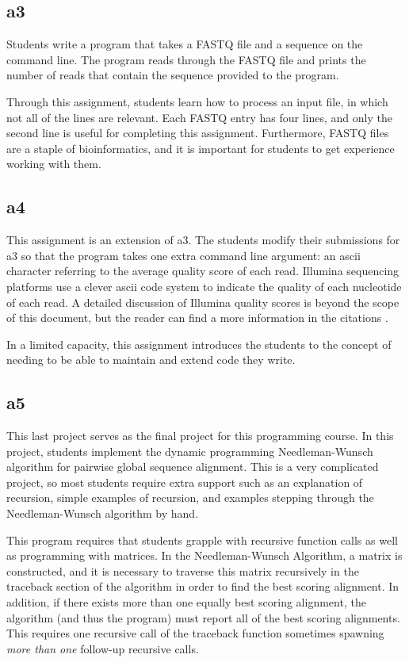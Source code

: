 \documentclass{report}
\begin{document}
\subsection{a3}
Students write a program that takes a FASTQ file and a sequence on the command line. The program reads through the FASTQ file and prints the number of reads that contain the sequence provided to the program.

Through this assignment, students learn how to process an input file, in which not all of the lines are relevant. Each FASTQ entry has four lines, and only the second line is useful for completing this assignment. Furthermore, FASTQ files are a staple of bioinformatics, and it is important for students to get experience working with them.

\subsection{a4}
This assignment is an extension of a3. The students modify their submissions for a3 so that the program takes one extra command line argument: an ascii character referring to the average quality score of each read. Illumina sequencing platforms use a clever ascii code system to indicate the quality of each nucleotide of each read. A detailed discussion of Illumina quality scores is beyond the scope of this document, but the reader can find a more information in the citations \cite{cock2010sanger}.

In a limited capacity, this assignment introduces the students to the concept of needing to be able to maintain and extend code they write.

\subsection{a5}
This last project serves as the final project for this programming course. In this project, students implement the dynamic programming Needleman-Wunsch algorithm for pairwise global sequence alignment. This is a very complicated project, so most students require extra support such as an explanation of recursion, simple examples of recursion,  and examples stepping through the Needleman-Wunsch algorithm by hand. 

This program requires that students grapple with recursive function calls as well as programming with matrices. In the Needleman-Wunsch Algorithm, a matrix is constructed, and it is necessary to traverse this matrix recursively in the traceback section of the algorithm in order to find the best scoring alignment. In addition, if there exists more than one equally best scoring alignment, the algorithm (and thus the program) must report all of the best scoring alignments. This requires one recursive call of the traceback function sometimes spawning \emph{more than one} follow-up recursive calls. 
\end{document}
